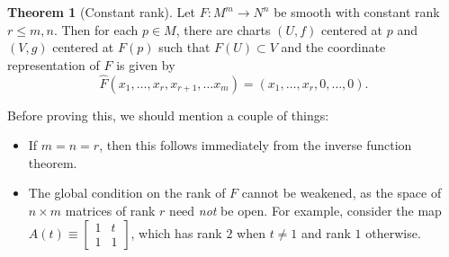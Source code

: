 \documentclass[10pt,letterpaper,cm]{nupset}
\theoremstyle{definition}
\theoremstyle{theorem}
\newtheorem{theorem}[definition]{Theorem}
\theoremstyle{remark}
\newcommand{\1}{\mathbf{1}}
\newcommand{\0}{\vec 0}
\begin{document}
\begin{theorem}[Constant rank]
Let $F: M^m \to N^n$ be smooth with constant rank $r\leq m, n$. Then for each $p\in M$, there are charts $(U, f)$ centered at $p$ and $(V, g)$ centered at $F(p)$ such that $F(U) \subset V$ and the coordinate representation of $F$ is given by $$\widehat{F}(x_1, \ldots, x_r, x_{r+1}, \ldots x_m) = \left(x_1, \ldots, x_r, 0,\ldots, 0\right).$$
\end{theorem}

Before proving this, we should mention a couple of things:

\begin{itemize}
\item If $m=n =r$, then this follows immediately from the inverse function theorem. 
\item The global condition on the rank of $F$ cannot be weakened, as the space of $n\times m$ matrices of rank $r$ need \emph{not} be open. For example, consider the map $A(t) \equiv \begin{bmatrix} 1 & t \\ 1 & 1 \end{bmatrix}$, which has rank $2$ when $t\ne 1$ and rank $1$ otherwise.
\end{itemize}
\end{document}
